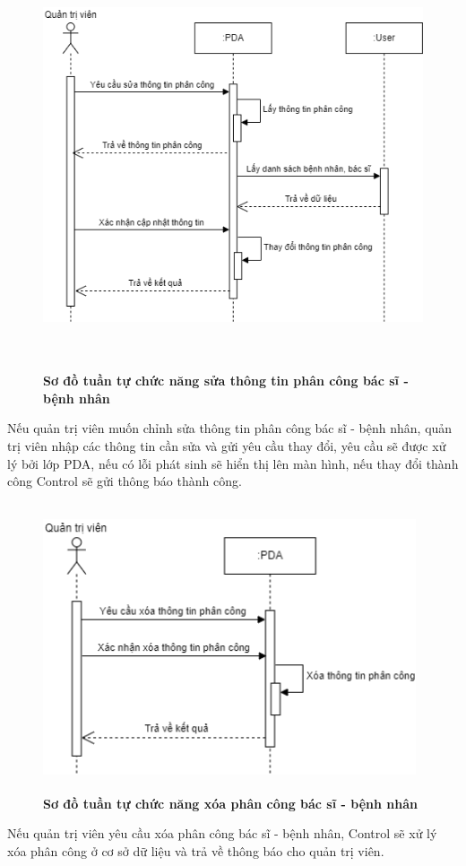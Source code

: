 \begin{figure}[H]
  \centering
  \includegraphics[width=13cm,height=12cm]{Images/sequence/sequence_manage_edit_pda.png}
  \caption[Sơ đồ tuần tự chức năng sửa thông tin phân công bác sĩ - bệnh nhân]{\bfseries \fontsize{12pt}{0pt}
  \selectfont Sơ đồ tuần tự chức năng sửa thông tin phân công bác sĩ - bệnh nhân}
  \label{sequence_manage_edit_pda} %
\end{figure}
Nếu quản trị viên muốn chỉnh sửa thông tin phân công bác sĩ - bệnh nhân, quản trị viên nhập các thông tin cần sửa và gửi yêu cầu thay đổi, 
yêu cầu sẽ được xử lý bởi lớp PDA, nếu có lỗi phát sinh sẽ hiển thị lên màn hình, nếu thay đổi thành công Control sẽ gửi thông báo thành công. 
\begin{figure}[H]
  \centering
  \includegraphics[width=11cm,height=8.5cm]{Images/sequence/sequence_manage_delete_pda.png}
  \caption[Sơ đồ tuần tự chức năng xóa phân công bác sĩ - bệnh nhân]{\bfseries \fontsize{12pt}{0pt}
  \selectfont Sơ đồ tuần tự chức năng xóa phân công bác sĩ - bệnh nhân}
  \label{sequence_manage_delete_pda} %
\end{figure}
Nếu quản trị viên yêu cầu xóa phân công bác sĩ - bệnh nhân, Control sẽ xử lý xóa phân công ở cơ sở dữ liệu và trả về thông báo cho quản trị viên.

